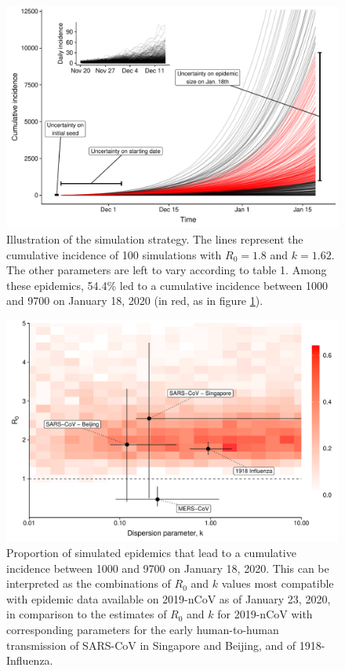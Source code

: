 \documentclass{article}
\begin{document}
\begin{figure}[h]
	\centering
	\includegraphics[width=.9\linewidth]{../figure/fig3b.pdf}
	\caption{Illustration of the simulation strategy. The lines represent the cumulative incidence of 100 simulations with $R_0=1.8$ and $k=1.62$. The other parameters are left to vary according to table 1. Among these epidemics, 54.4\% led to a cumulative incidence between 1000 and 9700 on January 18, 2020 (in red, as in figure \ref{fig:fig3}).}
	\label{fig:fig3}
\end{figure}


\begin{figure}[h]
	\centering
	\includegraphics[width=.9\linewidth]{../figure/fig1.pdf}
	\caption{Proportion of simulated epidemics that lead to a cumulative incidence between 1000 and 9700 on January 18, 2020. This can be interpreted as the combinations of $R_0$ and $k$ values most compatible with epidemic data available on 2019-nCoV as of January 23, 2020, in comparison to the estimates of $R_0$ and $k$ for 2019-nCoV with corresponding parameters for the early human-to-human transmission of SARS-CoV in Singapore and Beijing, and of 1918-Influenza.\cite{Lloyd-Smith:2005,Fraser:2011,Kucharski:2015b}
	}
	\label{fig:fig1}
\end{figure}
\end{document}

